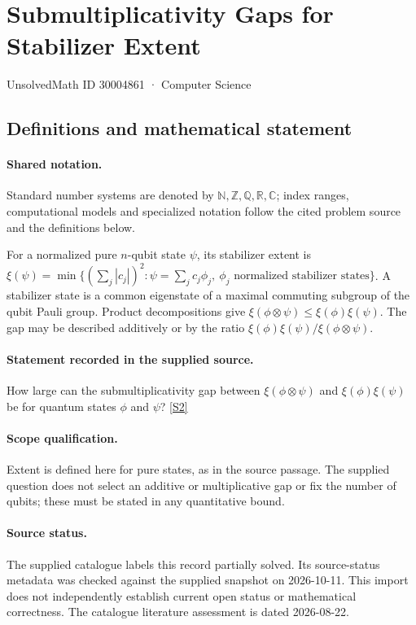 \documentclass[11pt]{article}
\newcommand{\sref}[2]{\hyperlink{source:#1:#2}{[S#2]}}
\begin{document}
\setcounter{section}{30004860}
\section{Submultiplicativity Gaps for Stabilizer Extent}\label{30004861}
{\small\sffamily UnsolvedMath ID 30004861 · Computer Science}
\subsection{Definitions and mathematical statement}

\paragraph{Shared notation.}Standard number systems are denoted by $\mathbb N,\mathbb Z,\mathbb Q,\mathbb R,\mathbb C$; index ranges, computational models and specialized notation follow the cited problem source and the definitions below.


For a normalized pure $n$-qubit state $\psi$, its stabilizer extent is $\xi(\psi)=\min\{(\sum_j|c_j|)^2:\psi=\sum_jc_j\phi_j,\ \phi_j\text{ normalized stabilizer states}\}$. A stabilizer state is a common eigenstate of a maximal commuting subgroup of the qubit Pauli group. Product decompositions give $\xi(\phi\otimes\psi)\leq\xi(\phi)\xi(\psi)$. The gap may be described additively or by the ratio $\xi(\phi)\xi(\psi)/\xi(\phi\otimes\psi)$.
\paragraph{Statement recorded in the supplied source.}
How large can the submultiplicativity gap between $\xi(\phi\otimes\psi)$ and $\xi(\phi)\xi(\psi)$ be for quantum states $\phi$ and $\psi$? \sref{30004861}{2}
\paragraph{Scope qualification.}
Extent is defined here for pure states, as in the source passage. The supplied question does not select an additive or multiplicative gap or fix the number of qubits; these must be stated in any quantitative bound.
\paragraph{Source status.}
The supplied catalogue labels this record partially solved. Its source-status metadata was checked against the supplied snapshot on 2026-10-11. This import does not independently establish current open status or mathematical correctness. The catalogue literature assessment is dated 2026-08-22.
\end{document}
